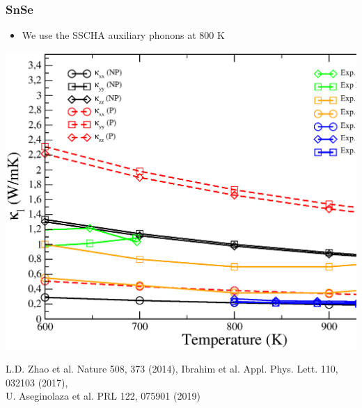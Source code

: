 \documentclass{beamer}
\begin{document}

\begin{frame}

\frametitle{SnSe}
\begin{itemize}
 \item We use the SSCHA auxiliary phonons at $800$ K
\end{itemize}
\vspace{-0.3cm}
\begin{center}
 \includegraphics[width=0.80\linewidth]{Pictures/SnSe/tk-SnSe2.eps}
\end{center}
\vspace{-0.3cm}
\begin{tiny}
 L.D. Zhao et al. Nature 508, 373 (2014),
 Ibrahim et al. Appl. Phys. Lett. 110, 032103 (2017), \\
 U. Aseginolaza et al. PRL 122, 075901 (2019)
\end{tiny}

\end{frame}

\end{document}
